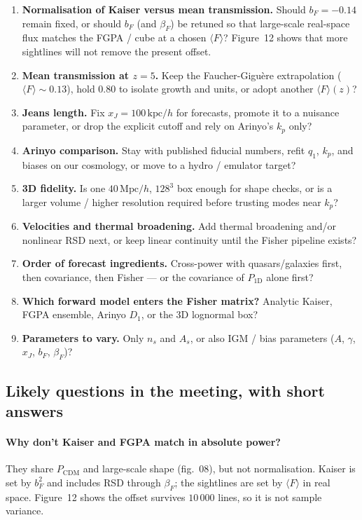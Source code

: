 \documentclass[11pt]{article}
\begin{document}
\begin{enumerate}
\item \textbf{Normalisation of Kaiser versus mean transmission.}
Should $b_F=-0.14$ remain fixed, or should $b_F$ (and $\beta_F$) be retuned so that large-scale real-space flux matches the FGPA / cube at a chosen $\langle F\rangle$?
Figure~12 shows that more sightlines will not remove the present offset.
\item \textbf{Mean transmission at $z=5$.}
Keep the Faucher-Gigu\`ere extrapolation ($\langle F\rangle\sim 0.13$), hold $0.80$ to isolate growth and units, or adopt another $\langle F\rangle(z)$?
\item \textbf{Jeans length.}
Fix $x_J=100\,\mathrm{kpc}/h$ for forecasts, promote it to a nuisance parameter, or drop the explicit cutoff and rely on Arinyo's $k_p$ only?
\item \textbf{Arinyo comparison.}
Stay with published fiducial numbers, refit $q_1$, $k_p$, and biases on our cosmology, or move to a hydro / emulator target?
\item \textbf{3D fidelity.}
Is one $40\,\mathrm{Mpc}/h$, $128^{3}$ box enough for shape checks, or is a larger volume / higher resolution required before trusting modes near $k_p$?
\item \textbf{Velocities and thermal broadening.}
Add thermal broadening and/or nonlinear RSD next, or keep linear continuity until the Fisher pipeline exists?
\item \textbf{Order of forecast ingredients.}
Cross-power with quasars/galaxies first, then covariance, then Fisher --- or the covariance of $P_{1\mathrm{D}}$ alone first?
\item \textbf{Which forward model enters the Fisher matrix?}
Analytic Kaiser, FGPA ensemble, Arinyo $D_1$, or the 3D lognormal box?
\item \textbf{Parameters to vary.}
Only $n_s$ and $A_s$, or also IGM / bias parameters ($A$, $\gamma$, $x_J$, $b_F$, $\beta_F$)?
\end{enumerate}

\subsection{Likely questions in the meeting, with short answers}

\paragraph{Why don't Kaiser and FGPA match in absolute power?}
They share $P_\mathrm{CDM}$ and large-scale shape (fig.~08), but not normalisation.
Kaiser is set by $b_F^{2}$ and includes RSD through $\beta_F$; the sightlines are set by $\langle F\rangle$ in real space.
Figure~12 shows the offset survives $10\,000$ lines, so it is not sample variance.
\end{document}
